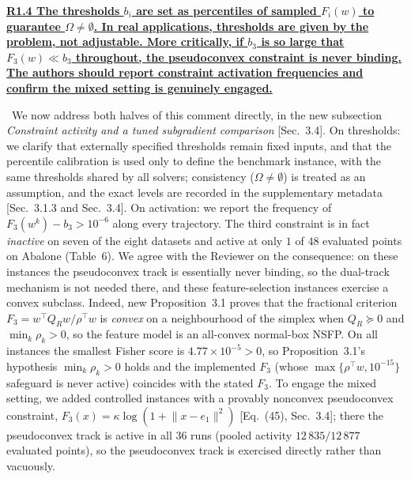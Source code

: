 \documentclass[11pt]{article}
\newcommand{\response}[1]{\smallskip\noindent{\color{blue!60!black}\textbf{Response.}}\ #1\par\medskip}
\newcommand{\loc}[1]{\textcolor{blue!50!black}{[#1]}}
\newenvironment{point}[1]{\medskip\noindent\textbf{\uline{#1}}\par}{\par}
\begin{document}
\begin{point}{R1.4 The thresholds $b_i$ are set as percentiles of sampled $F_i(w)$ to guarantee $\Omega\neq\emptyset$. In real applications, thresholds are given by the problem, not adjustable. More critically, if $b_3$ is so large that $F_3(w)\ll b_3$ throughout, the pseudoconvex constraint is never binding. The authors should report constraint activation frequencies and confirm the mixed setting is genuinely engaged.}
\response{We now address both halves of this comment directly, in the new subsection \emph{Constraint activity and a tuned subgradient comparison} \loc{Sec.~3.4}. On thresholds: we clarify that externally specified thresholds remain fixed inputs, and that the percentile calibration is used only to define the benchmark instance, with the same thresholds shared by all solvers; consistency ($\Omega\neq\emptyset$) is treated as an assumption, and the exact levels are recorded in the supplementary metadata \loc{Sec.~3.1.3 and Sec.~3.4}. On activation: we report the frequency of $F_3(w^k)-b_3>10^{-6}$ along every trajectory. The third constraint is in fact \emph{inactive} on seven of the eight datasets and active at only $1$ of $48$ evaluated points on Abalone (Table~6). We agree with the Reviewer on the consequence: on these instances the pseudoconvex track is essentially never binding, so the dual-track mechanism is not needed there, and these feature-selection instances exercise a convex subclass. Indeed, new Proposition~3.1 proves that the fractional criterion $F_3=w^{\top}Q_Rw/\rho^{\top}w$ is \emph{convex} on a neighbourhood of the simplex when $Q_R\succeq0$ and $\min_k\rho_k>0$, so the feature model is an all-convex normal-box NSFP. On all instances the smallest Fisher score is $4.77\times10^{-5}>0$, so Proposition~3.1's hypothesis $\min_k\rho_k>0$ holds and the implemented $F_3$ (whose $\max\{\rho^{\top}w,10^{-15}\}$ safeguard is never active) coincides with the stated $F_3$. To engage the mixed setting, we added controlled instances with a provably nonconvex pseudoconvex constraint, $F_3(x)=\kappa\log(1+\lVert x-e_1\rVert^2)$ \loc{Eq.~(45), Sec.~3.4}; there the pseudoconvex track is active in all $36$ runs (pooled activity $12\,835/12\,877$ evaluated points), so the pseudoconvex track is exercised directly rather than vacuously.}
\end{point}
\end{document}
